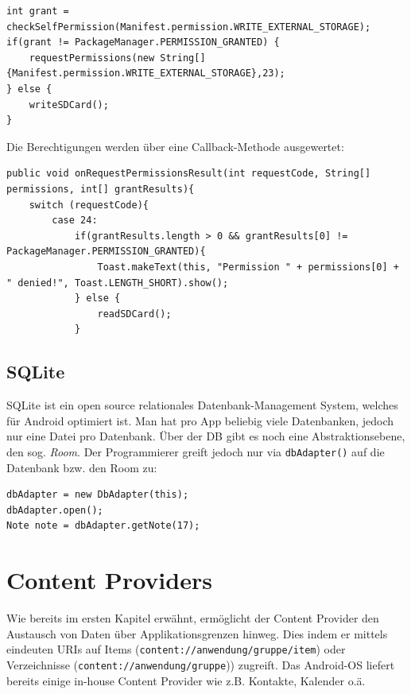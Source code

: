 \documentclass[a4paper, 11pt]{article}
\newcommand{\code}[1]{\texttt{#1}}
\begin{document}
\begin{lstlisting}[caption={Checken, ob man die Berechtigung hat und wenn nicht, Berechitung anfragen}]
int grant = checkSelfPermission(Manifest.permission.WRITE_EXTERNAL_STORAGE);
if(grant != PackageManager.PERMISSION_GRANTED) {
	requestPermissions(new String[]{Manifest.permission.WRITE_EXTERNAL_STORAGE},23);
} else {
	writeSDCard();
}
\end{lstlisting}

Die Berechtigungen werden über eine Callback-Methode ausgewertet:

\begin{lstlisting}[caption={Verarbeitung der Permission-Grants}]
public void onRequestPermissionsResult(int requestCode, String[] permissions, int[] grantResults){
	switch (requestCode){
		case 24:
			if(grantResults.length > 0 && grantResults[0] != PackageManager.PERMISSION_GRANTED){
				Toast.makeText(this, "Permission " + permissions[0] + " denied!", Toast.LENGTH_SHORT).show();
			} else {
				readSDCard();
			}
\end{lstlisting}

\subsection{SQLite}
SQLite ist ein open source relationales Datenbank-Management System, welches für Android optimiert ist. Man hat pro App beliebig viele Datenbanken, jedoch nur eine Datei pro Datenbank. Über der DB gibt es noch eine Abstraktionsebene, den sog. \textit{Room}. Der Programmierer greift jedoch nur via \code{dbAdapter()} auf die Datenbank bzw. den Room zu:

\begin{lstlisting}[caption={Anwendung des dbAdapters}]
dbAdapter = new DbAdapter(this);
dbAdapter.open();
Note note = dbAdapter.getNote(17);
\end{lstlisting}  

\section{Content Providers}
Wie bereits im ersten Kapitel erwähnt, ermöglicht der Content Provider den Austausch von Daten über Applikationsgrenzen hinweg. Dies indem er mittels eindeuten URIs auf Items (\code{content://anwendung/gruppe/item}) oder Verzeichnisse (\code{content://anwendung/gruppe})) zugreift. Das Android-OS liefert bereits einige in-house Content Provider wie z.B. Kontakte, Kalender o.ä. 
\end{document}
